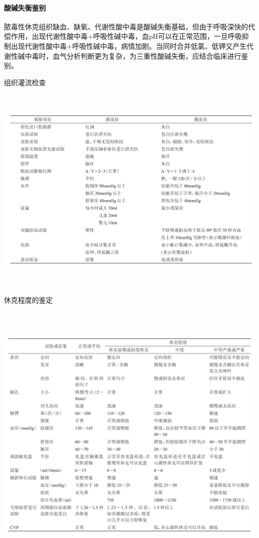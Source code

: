 \paragraph{酸碱失衡鉴别}

脓毒性休克组织缺血、缺氧、代谢性酸中毒是酸碱失衡基础，但由于呼吸深快的代偿作用，出现代谢性酸中毒+呼吸性碱中毒，血pH可以在正常范围，一旦呼吸抑制出现代谢性酸中毒+呼吸性碱中毒，病情加剧。当同时合并低氯、低钾又产生代谢性碱中毒时，血气分析判断更为复杂，为三重性酸碱失衡，应结合临床进行鉴别。

\begin{table}[htbp]
\centering
\caption{组织灌流检查}
\label{tab20-3}
\includegraphics[width=6.69792in,height=4.01042in]{./images/Image00086.jpg}
\end{table}

\begin{table}[htbp]
\centering
\caption{休克程度的鉴定}
\label{tab20-4}
\includegraphics[width=6.66667in,height=5.19792in]{./images/Image00087.jpg}
\end{table}

